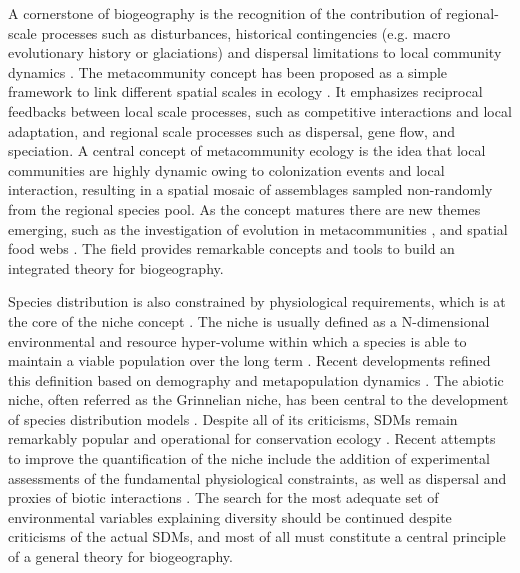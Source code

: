 A cornerstone of biogeography is the recognition of the contribution of regional-scale processes such as disturbances, historical contingencies (e.g. macro evolutionary history or glaciations) and dispersal limitations to local community dynamics \citep{Ricklefs1987}. The metacommunity concept has been proposed as a simple framework to link different spatial scales in ecology \citep{Leibold2004}. It emphasizes reciprocal feedbacks between local scale processes, such as competitive interactions and local adaptation, and regional scale processes such as dispersal, gene flow, and speciation. A central concept of metacommunity ecology is the idea that local communities are highly dynamic owing to colonization events and local interaction, resulting in a spatial mosaic of assemblages sampled non-randomly from the regional species pool. As the concept matures there are new themes emerging, such as the investigation of evolution in metacommunities \citep{Urban2008}, and spatial food webs \citep{Massol2011,Gravel2011}. The field provides remarkable concepts and tools to build an integrated theory for biogeography.

Species distribution is also constrained by physiological requirements, which is at the core of the niche concept \citep{Peterson2011}. The niche is usually defined as a N-dimensional environmental and resource hyper-volume within which a species is able to maintain a viable population over the long term \citep{Chase2003}. Recent developments refined this definition based on demography and metapopulation dynamics \citep{Holt2009}. The abiotic niche, often referred as the Grinnelian niche, has been central to the development of species distribution models \citep[SDMs,][]{Jeschke2008}. Despite all of its criticisms, SDMs remain remarkably popular and operational for conservation ecology \citep{Guisan2013}. Recent attempts to improve the quantification of the niche include the addition of experimental assessments of the fundamental physiological constraints, as well as dispersal and proxies of biotic interactions \citep{Boulangeat2012}. The search for the most adequate set of environmental variables explaining diversity should be continued despite criticisms of the actual SDMs, and most of all must constitute a central principle of a general theory for biogeography.

